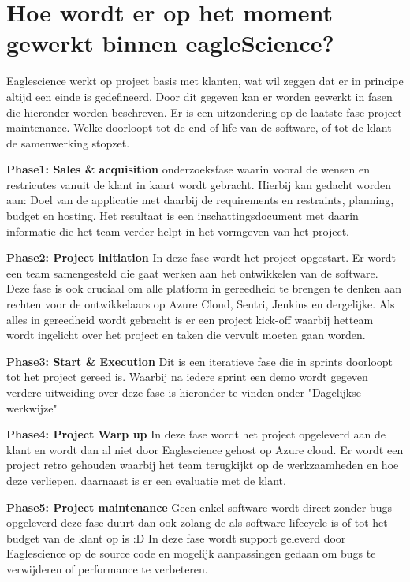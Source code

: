 \section{Hoe wordt er op het moment gewerkt binnen eagleScience?}\label{sec:hoe-wordt-er-op-het-moment-gewerkt-binnen-eaglescience?}
Eaglescience werkt op project basis met klanten, wat wil zeggen dat er in principe altijd een einde is gedefineerd.
Door dit gegeven kan er worden gewerkt in fasen die hieronder worden beschreven.
Er is een uitzondering op de laatste fase project maintenance.
Welke doorloopt tot de end-of-life van de software, of tot de klant de samenwerking stopzet.

\textbf{Phase1: Sales \& acquisition}
onderzoeksfase waarin vooral de wensen en restricutes vanuit de klant in kaart wordt gebracht.
Hierbij kan gedacht worden aan: Doel van de applicatie met daarbij de requirements en restraints, planning, budget en hosting.
Het resultaat is een inschattingsdocument met daarin informatie die het team verder helpt in het vormgeven van het project.

\textbf{Phase2: Project initiation}
In deze fase wordt het project opgestart.
Er wordt een team samengesteld die gaat werken aan het ontwikkelen van de software.
Deze fase is ook cruciaal om alle platform in gereedheid te brengen te denken aan rechten voor de ontwikkelaars op Azure Cloud, Sentri, Jenkins en dergelijke.
Als alles in gereedheid wordt gebracht is er een project kick-off waarbij hetteam wordt ingelicht over het project en taken die vervult moeten gaan worden.

\textbf{Phase3: Start \& Execution}
Dit is een iteratieve fase die in sprints doorloopt tot het project gereed is.
Waarbij na iedere sprint een demo wordt gegeven verdere uitweiding over deze fase is hieronder te vinden onder "Dagelijkse werkwijze"

\textbf{Phase4: Project Warp up}
In deze fase wordt het project opgeleverd aan de klant en wordt dan al niet door Eaglescience gehost op Azure cloud.
Er wordt een project retro gehouden waarbij het team terugkijkt op de werkzaamheden en hoe deze verliepen, daarnaast is er een evaluatie met de klant.

\textbf{Phase5: Project maintenance}
Geen enkel software wordt direct zonder bugs opgeleverd deze fase duurt dan ook zolang de als software lifecycle is of tot het budget van de klant op is :D In deze fase wordt support geleverd door Eaglescience op de source code en mogelijk aanpassingen gedaan om bugs te verwijderen of performance te verbeteren.

